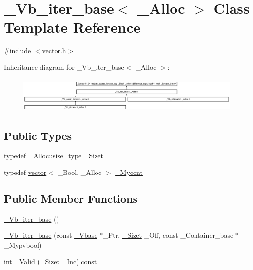 \hypertarget{class___vb__iter__base}{\section{\+\_\+\+Vb\+\_\+iter\+\_\+base$<$ \+\_\+\+Alloc $>$ Class Template Reference}
\label{class___vb__iter__base}
}


{\ttfamily \#include $<$vector.\+h$>$}

Inheritance diagram for \+\_\+\+Vb\+\_\+iter\+\_\+base$<$ \+\_\+\+Alloc $>$\+:\begin{figure}[H]
\begin{center}
\leavevmode
\includegraphics[height=1.803543cm]{class___vb__iter__base}
\end{center}
\end{figure}
\subsection*{Public Types}
\begin{DoxyCompactItemize}
\item 
typedef \+\_\+\+Alloc\+::size\+\_\+type \hyperlink{class___vb__iter__base_a43b848fb198e38fc0e831a270c07a60d}{\+\_\+\+Sizet}
\item 
typedef \hyperlink{classvector}{vector}$<$ \+\_\+\+Bool, \+\_\+\+Alloc $>$ \hyperlink{class___vb__iter__base_af0f146606d0f7f220d58bfa7ffada3b7}{\+\_\+\+Mycont}
\end{DoxyCompactItemize}
\subsection*{Public Member Functions}
\begin{DoxyCompactItemize}
\item 
\hyperlink{class___vb__iter__base_ae4cbe1ace2e26c6fcf673a15cf881d82}{\+\_\+\+Vb\+\_\+iter\+\_\+base} ()
\item 
\hyperlink{class___vb__iter__base_a7847ca8c4f1c49cc78f3ef0a5be406d4}{\+\_\+\+Vb\+\_\+iter\+\_\+base} (const \hyperlink{vector_8h_a1555a2f621ba9ade75bb9ce8bca77144}{\+\_\+\+Vbase} $\ast$\+\_\+\+Ptr, \hyperlink{class___vb__iter__base_a43b848fb198e38fc0e831a270c07a60d}{\+\_\+\+Sizet} \+\_\+\+Off, const \+\_\+\+Container\+\_\+base $\ast$\+\_\+\+Mypvbool)
\item 
int \hyperlink{class___vb__iter__base_a916ac903fceeced2345bdd305ec66fbc}{\+\_\+\+Valid} (\hyperlink{class___vb__iter__base_a43b848fb198e38fc0e831a270c07a60d}{\+\_\+\+Sizet} \+\_\+\+Inc) const 
\end{DoxyCompactItemize}
